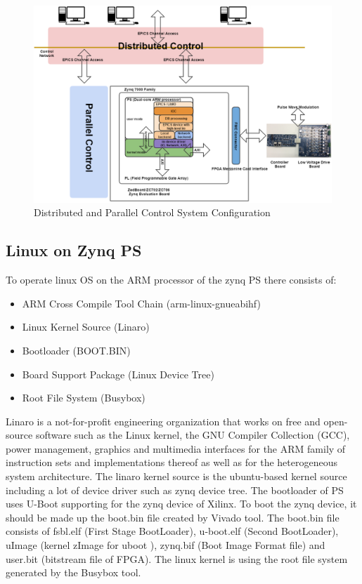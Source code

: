 \documentclass[journal]{IEEEtran}
\begin{document}
\begin{figure}[!tbh]
	\centering
	\includegraphics*[width=\textwidth,height=0.6\textwidth]{img01.png}
	\caption{Distributed and Parallel Control System Configuration}
	\label{control_system}
\end{figure}

\subsection{Linux on Zynq PS}
To operate linux OS on the ARM processor of the zynq PS there consists of:
\begin{itemize}
	\item ARM Cross Compile Tool Chain (arm-linux-gnueabihf)
	\item Linux Kernel Source (Linaro)
	\item Bootloader (BOOT.BIN)
	\item Board Support Package (Linux Device Tree)
	\item Root File System (Busybox)
\end{itemize}
\hfil\break
Linaro\cite{linaro} is a not-for-profit engineering organization that works on free and open-source software such as the Linux kernel, the GNU Compiler Collection (GCC), power management, graphics and multimedia interfaces for the ARM family of instruction sets and implementations thereof as well as for the heterogeneous system architecture. The linaro kernel source is the ubuntu-based kernel source including a lot of device driver such as zynq device tree. 
The bootloader of PS uses U-Boot\cite{u-boot} supporting for the zynq device of Xilinx. To boot the zynq device, it should be made up the boot.bin file created by Vivado\cite{vivado} tool. The boot.bin\cite{boot-bin} file consists of fsbl.elf (First Stage BootLoader), u-boot.elf (Second BootLoader), uImage (kernel zImage for uboot ), zynq.bif (Boot Image Format file) and user.bit (bitstream file of FPGA). The linux kernel is using the root file system generated by the Busybox\cite{busybox} tool.
\end{document}

